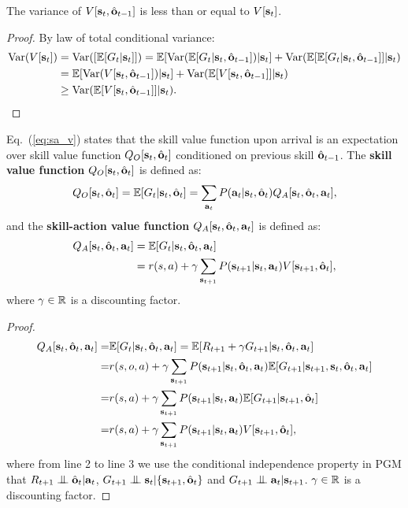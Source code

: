 \begin{prop}
  \label{prop:var_red}
  The variance of $V[ {\mathbf{s}}_t,\hat{{\mathbf{o}}}_{t-1} ]$ is less than or equal to $V[ {\mathbf{s}}_t ]$.
\end{prop}
\begin{proof}
  By law of total conditional variance:
\begin{align*}
  \text{Var}(V[{\mathbf{s}}_t]) &= \text{Var}([\mathbb{E}[G_t|{\mathbf{s}}_t]]) =\mathbb{E}[\text{Var}(\mathbb{E}[G_t|{\mathbf{s}}_t,\hat{{\mathbf{o}}}_{t-1}])|{\mathbf{s}}_t]+\text{Var}(\mathbb{E}[\mathbb{E}[G_t|{\mathbf{s}}_t,\hat{{\mathbf{o}}}_{t-1}]]|{\mathbf{s}}_t)\\
                        &= \mathbb{E}[\text{Var}(V[{\mathbf{s}}_t,\hat{{\mathbf{o}}}_{t-1}])|{\mathbf{s}}_t]+\text{Var}(\mathbb{E}[V[{\mathbf{s}}_t,\hat{{\mathbf{o}}}_{t-1}]]|{\mathbf{s}}_t)\\
  &\geq \text{Var}(\mathbb{E}[V[{\mathbf{s}}_t,\hat{{\mathbf{o}}}_{t-1}]]|{\mathbf{s}}_t).
\end{align*}
\end{proof}

Eq.~(\ref{eq:sa_v}) states that the skill value function upon
arrival is an expectation over skill value function
$Q_O[{\mathbf{s}}_t,\hat{{\mathbf{o}}}_{t}]$ conditioned on previous skill
$\hat{{\mathbf{o}}}_{t-1}$. The \textbf{skill value function}
$Q_O[{\mathbf{s}}_t,\hat{{\mathbf{o}}}_{t}]$ is defined as:
\begin{align}
  Q_O[{\mathbf{s}}_t,\hat{{\mathbf{o}}}_{t}]=\mathbb{E}[G_t|{\mathbf{s}}_t,\hat{{\mathbf{o}}}_{t}]
  \label{eq:sa_q_o}=\sum_{{\mathbf{a}}_t}P({\mathbf{a}}_t|{\mathbf{s}}_t,\hat{{\mathbf{o}}}_{t})Q_A[ {\mathbf{s}}_t,\hat{{\mathbf{o}}}_t,{\mathbf{a}}_t],
\end{align}
and the \textbf{skill-action value function} $Q_A[
{\mathbf{s}}_t,\hat{{\mathbf{o}}}_t,{\mathbf{a}}_t]$ is defined as:
\begin{align}
\label{eq:sa_q_a}
Q_A[ {\mathbf{s}}_t,\hat{{\mathbf{o}}}_t,{\mathbf{a}}_t]&=\mathbb{E}[G_t| {\mathbf{s}}_t,\hat{{\mathbf{o}}}_t,{\mathbf{a}}_t]\nonumber\\
   &= r(s,a) + \gamma\sum_{{\mathbf{s}}_{t+1}}P({\mathbf{s}}_{t+1}|{\mathbf{s}}_t,{\mathbf{a}}_t)V[{\mathbf{s}}_{t+1},\hat{{\mathbf{o}}}_t],
\end{align}
%
where $\gamma \in {\mathbb{R}}$ is a discounting factor.
\begin{proof}
  \begin{align*}
  Q_A[ {\mathbf{s}}_t,\hat{{\mathbf{o}}}_t,{\mathbf{a}}_t]=&\mathbb{E}[G_t| {\mathbf{s}}_t,\hat{{\mathbf{o}}}_t,{\mathbf{a}}_t]
                               =\mathbb{E}[R_{t+1}+\gamma G_{t+1}| {\mathbf{s}}_t,\hat{{\mathbf{o}}}_t,{\mathbf{a}}_t]\\
  =& r(s,o,a) + \gamma\sum_{{\mathbf{s}}_{t+1}}P({\mathbf{s}}_{t+1}|{\mathbf{s}}_t,\hat{{\mathbf{o}}}_t,{\mathbf{a}}_t)\mathbb{E}[G_{t+1}|{\mathbf{s}}_{t+1},{\mathbf{s}}_t,\hat{{\mathbf{o}}}_t,{\mathbf{a}}_t]\\
  =& r(s,a) + \gamma\sum_{{\mathbf{s}}_{t+1}}P({\mathbf{s}}_{t+1}|{\mathbf{s}}_t,{\mathbf{a}}_t)\mathbb{E}[G_{t+1}|{\mathbf{s}}_{t+1},\hat{{\mathbf{o}}}_t]\\
  =& r(s,a) + \gamma\sum_{{\mathbf{s}}_{t+1}}P({\mathbf{s}}_{t+1}|{\mathbf{s}}_t,{\mathbf{a}}_t)V[{\mathbf{s}}_{t+1},\hat{{\mathbf{o}}}_t],
\end{align*}
%
where from line 2 to line 3 we use the conditional independence
property in PGM that $R_{t+1}\bigCI\hat{\rvo}_{t}|\rva_t$,
$G_{t+1}\bigCI\rvs_{t}|\{\rvs_{t+1},\hat{\rvo}_t\}$ and
$G_{t+1}\bigCI\rva_{t}|\rvs_{t+1}$. $\gamma \in {\mathbb{R}}$ is a
discounting factor.
\end{proof}


